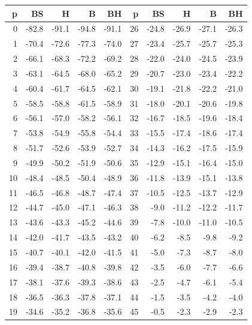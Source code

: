 \documentclass[a4paper,10pt,titlepage,oneside,openany]{book}
\theoremstyle{plain}
\theoremstyle{definition}
\theoremstyle{remark}
\begin{document}
\clearpage
\begin{table}[p]
\centering
\fontsize{7.4}{8.4}\selectfont
\setlength{\tabcolsep}{3.2pt}
\begin{tabular}{@{}rrrrr@{\hspace{8mm}}rrrrr@{}}
\toprule
p & BS & H & B & BH & p & BS & H & B & BH \\
\midrule
0 & -82.8 & -91.1 & -94.8 & -91.1 & 26 & -24.8 & -26.9 & -27.1 & -26.3 \\
1 & -70.4 & -72.6 & -77.3 & -74.0 & 27 & -23.4 & -25.7 & -25.7 & -25.3 \\
2 & -66.1 & -68.3 & -72.2 & -69.2 & 28 & -22.0 & -24.0 & -24.5 & -23.9 \\
3 & -63.1 & -64.5 & -68.0 & -65.2 & 29 & -20.7 & -23.0 & -23.4 & -22.2 \\
4 & -60.4 & -61.7 & -64.5 & -62.1 & 30 & -19.1 & -21.8 & -22.2 & -21.0 \\
5 & -58.5 & -58.8 & -61.5 & -58.9 & 31 & -18.0 & -20.1 & -20.6 & -19.8 \\
6 & -56.1 & -57.0 & -58.2 & -56.1 & 32 & -16.7 & -18.5 & -19.6 & -18.4 \\
7 & -53.8 & -54.9 & -55.8 & -54.4 & 33 & -15.5 & -17.4 & -18.6 & -17.4 \\
8 & -51.7 & -52.6 & -53.9 & -52.7 & 34 & -14.3 & -16.2 & -17.5 & -15.9 \\
9 & -49.9 & -50.2 & -51.9 & -50.6 & 35 & -12.9 & -15.1 & -16.4 & -15.0 \\
10 & -48.4 & -48.5 & -50.4 & -48.9 & 36 & -11.8 & -13.9 & -15.1 & -13.8 \\
11 & -46.5 & -46.8 & -48.7 & -47.4 & 37 & -10.5 & -12.5 & -13.7 & -12.9 \\
12 & -44.7 & -45.0 & -47.1 & -46.3 & 38 & -9.0 & -11.2 & -12.2 & -11.7 \\
13 & -43.6 & -43.3 & -45.2 & -44.6 & 39 & -7.8 & -10.0 & -11.0 & -10.5 \\
14 & -42.0 & -41.7 & -43.5 & -43.2 & 40 & -6.2 & -8.5 & -9.8 & -9.2 \\
15 & -40.7 & -40.1 & -42.0 & -41.5 & 41 & -5.0 & -7.3 & -8.7 & -8.0 \\
16 & -39.4 & -38.7 & -40.8 & -39.8 & 42 & -3.5 & -6.0 & -7.7 & -6.6 \\
17 & -38.1 & -37.6 & -39.3 & -38.6 & 43 & -2.5 & -4.7 & -6.1 & -5.4 \\
18 & -36.5 & -36.3 & -37.8 & -37.1 & 44 & -1.5 & -3.5 & -4.2 & -4.0 \\
19 & -34.6 & -35.2 & -36.8 & -35.6 & 45 & -0.5 & -2.3 & -2.9 & -2.3 \\

\end{tabular}
\end{table}
\end{document}
